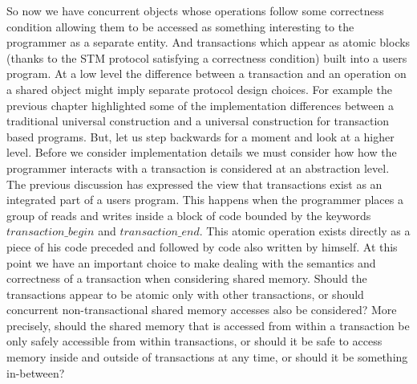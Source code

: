 So now we have concurrent objects whose operations follow some correctness condition
allowing them to be accessed as something interesting to the programmer as
a separate entity.
And transactions which appear as atomic blocks (thanks to the STM protocol
satisfying a correctness condition) built into a users program.
At a low level the difference between a transaction and an operation
on a shared object might imply separate protocol design choices.
For example the previous chapter highlighted some of the implementation
differences between a traditional universal construction and a
universal construction for transaction based programs.
But, let us step backwards for a moment and look at a higher level.
Before we consider implementation details we must consider how
how the programmer interacts with a transaction is considered at an abstraction level.
The previous discussion
has expressed the view that transactions exist as an integrated part of
a users program.
This happens when the programmer places a group of reads and writes
inside a block of code bounded by the keywords $transaction\_begin$ and
$transaction\_end$.
This atomic operation exists directly as a piece of his code preceded
and followed by code also written by himself.
At this point we have an important choice to make dealing with the
semantics and correctness of a transaction when considering shared memory.
Should the transactions appear to be atomic only with other transactions, or should
concurrent non-transactional shared memory accesses also be considered?
More precisely, should the shared memory that is accessed from within a transaction
be only safely accessible from within transactions, or should it be
safe to access memory inside and outside of transactions at any time,
or should it be something in-between?

